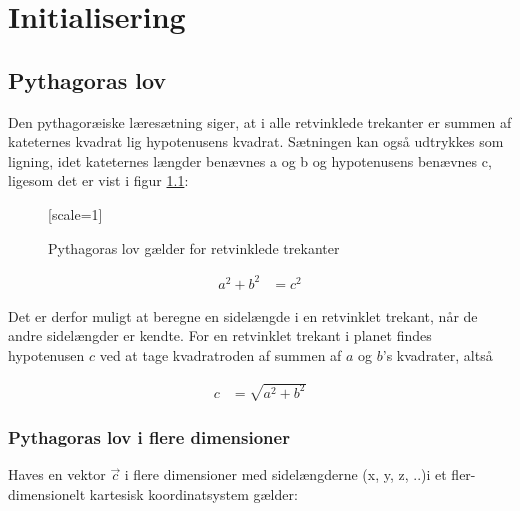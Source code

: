 \documentclass[11pt,a4paper]{memoir}
\begin{document}
\chapter{Initialisering}

\section{Pythagoras lov}
Den pythagoræiske læresætning siger, at i alle retvinklede trekanter er summen af kateternes kvadrat lig hypotenusens kvadrat. Sætningen kan også udtrykkes som ligning, idet kateternes længder benævnes a og b og hypotenusens benævnes c, ligesom det er vist i figur \ref{fig:pythagoras}:

\begin{figure}
[scale=1]
\caption{Pythagoras lov gælder for retvinklede trekanter}
\label{fig:pythagoras}
\end{figure}

\begin{equation}
\begin{aligned}
a^2 + b^2 &= c^2
\end{aligned}
\end{equation}

Det er derfor muligt at beregne en sidelængde i en retvinklet trekant, når de andre sidelængder er kendte. For en retvinklet trekant i planet findes hypotenusen $c$ ved at tage kvadratroden af summen af $a$ og $b$'s kvadrater, altså

\begin{equation}
\begin{aligned}
c &= \sqrt{a^2 + b^2}
\end{aligned}
\end{equation}

\FloatBarrier
\subsection{Pythagoras lov i flere dimensioner}
Haves en vektor $\vec{c}$ i flere dimensioner med sidelængderne (x, y, z, ..)i et fler-dimensionelt kartesisk koordinatsystem gælder:
\end{document}
